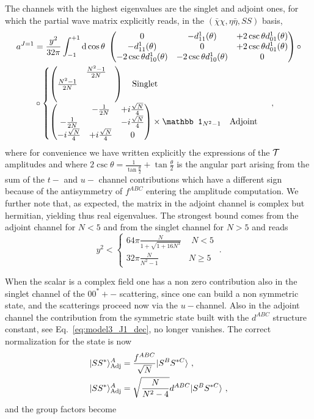 \documentclass[a4paper,11pt]{article}
\newcommand{\be}{\begin{equation}}
\newcommand{\ee}{\end{equation}}
\newcommand{\nn}{\nonumber}
\begin{document}
The channels with the highest eigenvalues are the singlet and adjoint ones, for which the partial wave matrix explicitly reads, in the $(\bar\chi \chi,\eta\bar\eta, S S)$ basis,
%
\begin{align}
a^{J=1}&=\frac{y^2}{32\pi} \int_{-1}^{+1}{\rm d}\cos\theta \; 
\begin{pmatrix}
0 &  -d^{1}_{11}(\theta) & +2\csc\theta d^{1}_{01}(\theta) \\
- d^{1}_{11}(\theta) & 0 & +2\csc\theta d^{1}_{01}(\theta) \\
-2\csc\theta d^{1}_{10}(\theta) & -2\csc\theta d^{1}_{10}(\theta) & 0
\end{pmatrix}\circ \nn \\
& \circ
\begin{cases}
\begin{pmatrix}
 & \frac{N^2-1}{2N}  & \\
\frac{N^2-1}{2N}  &  &\\
& & 
\end{pmatrix} \quad {\rm Singlet} \\
%
\begin{pmatrix}
 & -\frac{1}{2N} & +i\frac{\sqrt N}{4} \\
-\frac{1}{2N} & & -i\frac{\sqrt N}{4} \\
-i\frac{\sqrt N}{4} & + i\frac{\sqrt N}{4} & 0
\end{pmatrix}\times {\mathbb 1}_{N^2-1} \quad {\rm Adjoint} \\
\end{cases}
\ ,
\end{align}
where for convenience we have written explicitly the expressions of the ${\cal T}$ amplitudes and where
$2\csc\theta=\frac{1}{\tan\frac{\theta}{2}}+\tan\frac{\theta}{2}$ is the angular part arising from the sum of the $t-$ and $u-$ channel contributions which have a different sign because of the antisymmetry of $f^{ABC}$ entering the amplitude computation. We further note that, as expected, the matrix in the adjoint channel is complex but hermitian, yielding thus real eigenvalues. The strongest bound comes from the adjoint channel for $N<5$ and from the singlet channel for $N>5$ and reads
\be
y^2 <
\begin{cases}
64\pi \frac{N}{1+\sqrt{1+16 N^3}} \, \quad N < 5\\
32 \pi \frac{N}{N^2-1} \,\,\,\qquad \quad N \ge 5
\end{cases} \ .
\ee

When the scalar is a complex field one has a non zero contribution also in the singlet channel of the $00^*+-$ scattering, since one can build a non symmetric state, and the scatterings 
proceed now via the $u-$channel. Also in the adjoint channel the contribution from the symmetric state built with the $d^{ABC}$ structure constant, see Eq.~\eqref{eq:model3_J1_dec}, no longer vanishes. The correct normalization for the state is now
\begin{align}
& |S S^* \rangle^A_{{\rm Adj}} = \frac{f^{ABC}}{\sqrt N}|S^B S^{*C}\rangle \ ,  \nn \\
& |S S^* \rangle^A_{{\rm Adj}} =\sqrt{\frac{N}{N^2-4}} d^{ABC}|S^B S^{*C}\rangle \ , 
\end{align}
and the group factors become
\end{document}
